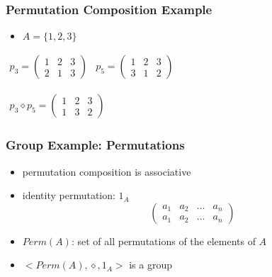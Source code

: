 \documentclass[dvipsnames]{beamer}
\begin{document}
\begin{frame}
  \frametitle{Permutation Composition Example}

  \begin{itemize}
    \item $A = \{1,2,3\}$
  \end{itemize}

  \medskip
  \begin{center}
  $\begin{array}{cc}
    p_3 = \left(
      \begin{array}{ccc}
        1 & 2 & 3\\
        2 & 1 & 3
      \end{array}
    \right) &
    p_5 = \left(
      \begin{array}{ccc}
        1 & 2 & 3\\
        3 & 1 & 2
      \end{array}
    \right)
  \end{array}$

  \medskip
  $\begin{array}{c}
    p_3 \diamond p_5 = \left(
      \begin{array}{ccc}
        1 & 2 & 3\\
        1 & 3 & 2
      \end{array}
    \right)
  \end{array}$
  \end{center}
\end{frame}

\begin{frame}
  \frametitle{Group Example: Permutations}

  \begin{itemize}
    \item permutation composition is associative
    \item identity permutation: $1_A$
    \[\left(
      \begin{array}{cccc}
         a_1 & a_2 & \dots & a_n\\
         a_1 & a_2 & \dots & a_n
      \end{array}
    \right)\]

    \pause
    \medskip
    \item $Perm(A)$: set of all permutations of the elements of $A$
    \item $<Perm(A), \diamond, 1_A>$ is a group
  \end{itemize}
\end{frame}
\end{document}
